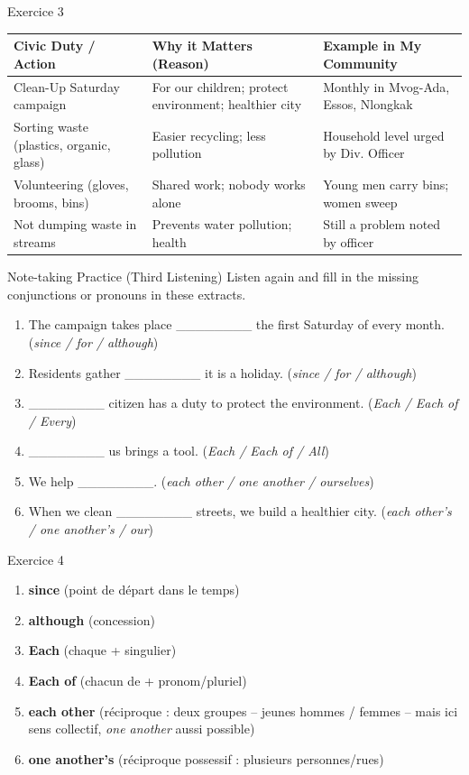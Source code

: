 \documentclass[11pt]{article}
\begin{document}
\begin{corrige}{Exercice 3}
\begin{center}
\begin{tabularx}{\linewidth}{|l|X|X|}\hline
\rowcolor{popblueL}
\textbf{Civic Duty / Action} & \textbf{Why it Matters (Reason)} & \textbf{Example in My Community} \\ \hline
Clean-Up Saturday campaign & For our children; protect environment; healthier city & Monthly in Mvog-Ada, Essos, Nlongkak \\ \hline
Sorting waste (plastics, organic, glass) & Easier recycling; less pollution & Household level urged by Div. Officer \\ \hline
Volunteering (gloves, brooms, bins) & Shared work; nobody works alone & Young men carry bins; women sweep \\ \hline
Not dumping waste in streams & Prevents water pollution; health & Still a problem noted by officer \\ \hline
\end{tabularx}
\end{center}
\end{corrige}

\begin{exercice}{Note-taking Practice (Third Listening)}
Listen again and fill in the missing conjunctions or pronouns in these extracts.
\begin{enumerate}
\item The campaign takes place \_\_\_\_\_\_\_\_ the first Saturday of every month. (\emph{since / for / although})
\item Residents gather \_\_\_\_\_\_\_\_ it is a holiday. (\emph{since / for / although})
\item \_\_\_\_\_\_\_\_ citizen has a duty to protect the environment. (\emph{Each / Each of / Every})
\item \_\_\_\_\_\_\_\_ us brings a tool. (\emph{Each / Each of / All})
\item We help \_\_\_\_\_\_\_\_. (\emph{each other / one another / ourselves})
\item When we clean \_\_\_\_\_\_\_\_ streets, we build a healthier city. (\emph{each other's / one another's / our})
\end{enumerate}
\end{exercice}

\begin{corrige}{Exercice 4}
\begin{enumerate}
\item \textbf{since} (point de départ dans le temps)
\item \textbf{although} (concession)
\item \textbf{Each} (chaque + singulier)
\item \textbf{Each of} (chacun de + pronom/pluriel)
\item \textbf{each other} (réciproque : deux groupes -- jeunes hommes / femmes -- mais ici sens collectif, \emph{one another} aussi possible)
\item \textbf{one another's} (réciproque possessif : plusieurs personnes/rues)
\end{enumerate}
\end{corrige}
\end{document}
